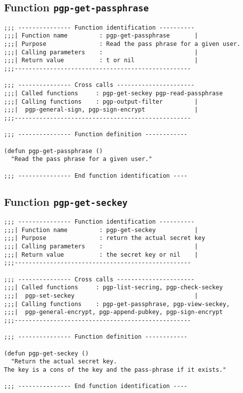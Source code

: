 \subsection{Function {\tt pgp-get-passphrase}}
\leavevmode
\begin{verbatim}
;;; --------------- Function identification ----------
;;;| Function name         : pgp-get-passphrase       |
;;;| Purpose               : Read the pass phrase for a given user.
;;;| Calling parameters    :                          |
;;;| Return value          : t or nil                 |
;;;--------------------------------------------------

;;; --------------- Cross calls ----------------------
;;;| Called functions     : pgp-get-seckey pgp-read-passphrase
;;;| Calling functions    : pgp-output-filter         |
;;;|  pgp-general-sign, pgp-sign-encrypt              |
;;;--------------------------------------------------

;;; --------------- Function definition ------------

(defun pgp-get-passphrase ()
  "Read the pass phrase for a given user."

;;; --------------- End function identification ----
\end{verbatim}
\subsection{Function {\tt pgp-get-seckey}}
\leavevmode
\begin{verbatim}
;;; --------------- Function identification ----------
;;;| Function name         : pgp-get-seckey           |
;;;| Purpose               : return the actual secret key
;;;| Calling parameters    :                          |
;;;| Return value          : the secret key or nil    |
;;;--------------------------------------------------

;;; --------------- Cross calls ----------------------
;;;| Called functions     : pgp-list-secring, pgp-check-seckey
;;;|  pgp-set-seckey                                  |
;;;| Calling functions    : pgp-get-passphrase, pgp-view-seckey,
;;;|  pgp-general-encrypt, pgp-append-pubkey, pgp-sign-encrypt
;;;--------------------------------------------------

;;; --------------- Function definition ------------

(defun pgp-get-seckey ()
  "Return the actual secret key.
The key is a cons of the key and the pass-phrase if it exists."

;;; --------------- End function identification ----
\end{verbatim}
